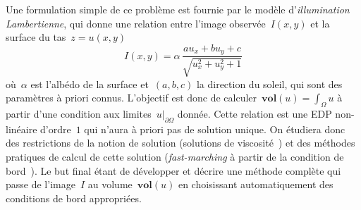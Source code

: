 \documentclass[a4paper,10pt]{article}
\begin{document}
Une formulation simple de ce problème est fournie par le modèle
d'\emph{illumination Lambertienne}, qui donne une relation entre l'image
observée~$I(x,y)$ et la surface du tas~$z=u(x,y)$
\[
	I(x,y) = \alpha\, \frac{au_x+bu_y+c}{
	\sqrt{u_x^2+u_y^2+1}}
\]
où~$\alpha$ est l'albédo de la surface et~$(a,b,c)$ la direction du soleil, qui
sont des paramètres à priori connus.  L'objectif est donc de
calculer~$\mathbf{vol}(u)=\int_{\Omega}u$ à partir d'une condition aux
limites~$u|_{\partial\Omega}$ donnée.  Cette relation est une EDP non-linéaire d'ordre~$1$
qui n'aura à priori pas de solution unique.  On étudiera donc des restrictions
de la notion de solution (solutions de viscosité~\cite{viscosite}) et des méthodes pratiques de
calcul de cette solution (\emph{fast-marching} à partir de la condition de
bord~\cite{mirebeau}).
Le but final étant de développer et décrire une méthode complète qui passe de
l'image~$I$ au volume~$\mathbf{vol}(u)$ en choisissant automatiquement des
conditions de bord appropriées.

\end{document}
